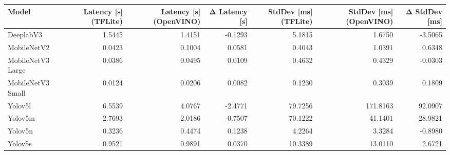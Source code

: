 \begin{tabular}{lrrrrrr}
\toprule
Model & Latency [s] (TFLite) & Latency [s] (OpenVINO) & Δ Latency [s] & StdDev [ms] (TFLite) & StdDev [ms] (OpenVINO) & Δ StdDev [ms] \\
\midrule
DeeplabV3 & 1.5445 & 1.4151 & -0.1293 & 5.1815 & 1.6750 & -3.5065 \\
MobileNetV2 & 0.0423 & 0.1004 & 0.0581 & 0.4043 & 1.0391 & 0.6348 \\
MobileNetV3 Large & 0.0386 & 0.0495 & 0.0109 & 0.4632 & 0.4329 & -0.0303 \\
MobileNetV3 Small & 0.0124 & 0.0206 & 0.0082 & 0.1230 & 0.3039 & 0.1809 \\
Yolov5l & 6.5539 & 4.0767 & -2.4771 & 79.7256 & 171.8163 & 92.0907 \\
Yolov5m & 2.7693 & 2.0186 & -0.7507 & 70.1222 & 41.1401 & -28.9821 \\
Yolov5n & 0.3236 & 0.4474 & 0.1238 & 4.2264 & 3.3284 & -0.8980 \\
Yolov5s & 0.9521 & 0.9891 & 0.0370 & 10.3389 & 13.0110 & 2.6721 \\
\bottomrule
\end{tabular}
